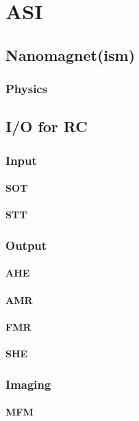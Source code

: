\section{ASI}\label{sec:ASI}
\subsection{Nanomagnet(ism)}
\subsubsection{Physics} %
\subsection{I/O for RC}
\subsubsection{Input}
\paragraph{SOT}
\paragraph{STT} %
\subsubsection{Output}
\paragraph{AHE}
\paragraph{AMR} %
\paragraph{FMR} %
\paragraph{SHE} %
\subsubsection{Imaging} %
\paragraph{MFM}
